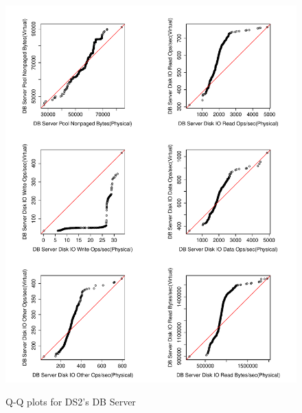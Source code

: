 \begin{figure}[tbh]
	\centering
	{\includegraphics[width=1.0\textwidth]{figures/appendix/qq_plots/DS2/DB_Server/Third_six.pdf}}
	\caption{Q-Q plots for DS2's DB Server}
\end{figure}

